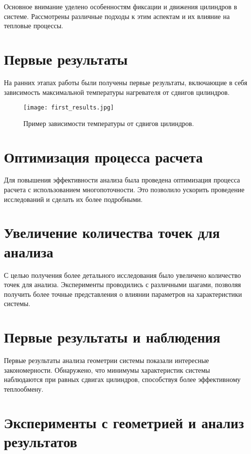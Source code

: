 \documentclass{beamer}
\begin{document}
Основное внимание уделено особенностям фиксации и движения цилиндров в системе. Рассмотрены различные подходы к этим аспектам и их влияние на тепловые процессы.

\section{Первые результаты}

На ранних этапах работы были получены первые результаты, включающие в себя зависимость максимальной температуры нагревателя от сдвигов цилиндров.

\begin{figure}[h]
	\centering
	\texttt{[image: first\_results.jpg]}
	\caption{Пример зависимости температуры от сдвигов цилиндров.}
\end{figure}

\section{Оптимизация процесса расчета}

Для повышения эффективности анализа была проведена оптимизация процесса расчета с использованием многопоточности. Это позволило ускорить проведение исследований и сделать их более подробными.

\section{Увеличение количества точек для анализа}

С целью получения более детального исследования было увеличено количество точек для анализа. Эксперименты проводились с различными шагами, позволяя получить более точные представления о влиянии параметров на характеристики системы.

\section{Первые результаты и наблюдения}

Первые результаты анализа геометрии системы показали интересные закономерности. Обнаружено, что минимумы характеристик системы наблюдаются при равных сдвигах цилиндров, способствуя более эффективному теплообмену.

\section{Эксперименты с геометрией и анализ результатов}
\end{document}
